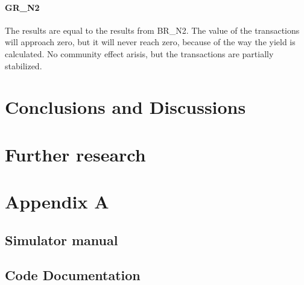 \documentclass[twoside,openright]{uva-bachelor-thesis}
\begin{document}
\subsubsection{GR\_N2}
The results are equal to the results from BR\_N2. The value of the transactions will approach zero, but it will never reach zero, because of the way the yield is calculated. No community effect arisis, but the transactions are partially stabilized.

\chapter{Conclusions and Discussions}

\chapter{Further research}

\chapter{Appendix A}

\section{Simulator manual}

\section{Code Documentation}
\end{document}
